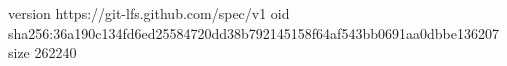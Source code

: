 version https://git-lfs.github.com/spec/v1
oid sha256:36a190c134fd6ed25584720dd38b792145158f64af543bb0691aa0dbbe136207
size 262240
